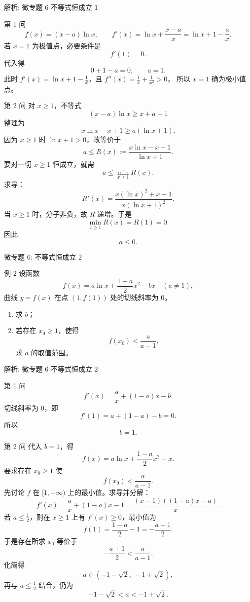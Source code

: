 ﻿\documentclass[aspectratio=169,10pt]{ctexbeamer}
\begin{document}
\begin{frame}[t,allowframebreaks]{解析: 微专题 6 不等式恒成立 1}
\tiny
\begin{block}{第 1 问}
\[
f(x)=(x-a)\ln x,\qquad f'(x)=\ln x+\frac{x-a}{x}=\ln x+1-\frac ax.
\]
若 $x=1$ 为极值点，必要条件是
\[
f'(1)=0.
\]
代入得
\[
0+1-a=0,\qquad a=1.
\]
此时 $f'(x)=\ln x+1-\frac1x$，且 $f''(x)=\frac1x+\frac1{x^2}>0$，
所以 $x=1$ 确为极小值点。
\end{block}
\begin{block}{第 2 问}
对 $x\ge1$，不等式
\[
(x-a)\ln x\ge x+a-1
\]
整理为
\[
x\ln x-x+1\ge a(\ln x+1).
\]
因为 $x\ge1$ 时 $\ln x+1>0$，故等价于
\[
a\le R(x):=\frac{x\ln x-x+1}{\ln x+1}.
\]
要对一切 $x\ge1$ 恒成立，就需
\[
a\le \min_{x\ge1}R(x).
\]
求导：
\[
R'(x)=\frac{x(\ln x)^2+x-1}{x(\ln x+1)^2}.
\]
当 $x\ge1$ 时，分子非负，故 $R$ 递增。于是
\[
\min_{x\ge1}R(x)=R(1)=0.
\]
因此
\[
a\le0.
\]
\end{block}
\end{frame}

\begin{frame}[t]{微专题 6: 不等式恒成立 2}
\large
\begin{block}{例 2}
设函数
\[
f(x)=a\ln x+\frac{1-a}{2}x^2-bx\quad (a\ne 1),
\]
曲线 $y=f(x)$ 在点 $(1,f(1))$ 处的切线斜率为 $0$。
\begin{enumerate}
  \item 求 $b$；
  \item 若存在 $x_0\ge 1$，使得
  \[
  f(x_0)<\frac{a}{a-1},
  \]
  求 $a$ 的取值范围。
\end{enumerate}
\end{block}
\end{frame}

\begin{frame}[t,allowframebreaks]{解析: 微专题 6 不等式恒成立 2}
\tiny
\begin{block}{第 1 问}
\[
f'(x)=\frac ax+(1-a)x-b.
\]
切线斜率为 $0$，即
\[
f'(1)=a+(1-a)-b=0.
\]
所以
\[
b=1.
\]
\end{block}
\begin{block}{第 2 问}
代入 $b=1$，得
\[
f(x)=a\ln x+\frac{1-a}{2}x^2-x.
\]
要求存在 $x_0\ge1$ 使
\[
f(x_0)<\frac a{a-1}.
\]
先讨论 $f$ 在 $[1,+\infty)$ 上的最小值。求导并分解：
\[
f'(x)=\frac ax+(1-a)x-1
=\frac{(x-1)((1-a)x-a)}x.
\]
若 $a\le \frac12$，则在 $x\ge1$ 上有 $f'(x)\ge0$，最小值为
\[
f(1)=\frac{1-a}{2}-1=-\frac{a+1}{2}.
\]
于是存在所求 $x_0$ 等价于
\[
-\frac{a+1}{2}<\frac a{a-1}.
\]
化简得
\[
a\in(-1-\sqrt2,\,-1+\sqrt2),
\]
再与 $a\le\frac12$ 结合，仍为
\[
-1-\sqrt2<a<-1+\sqrt2.
\]
\end{block}
\end{frame}
\end{document}
